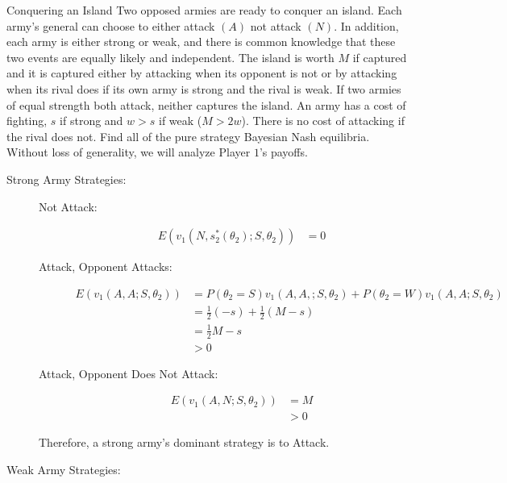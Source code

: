 \documentclass[9pt]{extarticle}
\title{}
\author{}
\date{}
\begin{document}
  \begin{problem}{Conquering an Island}
    Two opposed armies are ready to conquer an island. Each army's general can choose to either attack $(A)$ not attack $(N)$. In addition, each army is either strong or weak, and there is common knowledge that these two events are equally likely and independent. The island is worth $M$ if captured and it is captured either by attacking when its opponent is not or by attacking when its rival does if its own army is strong and the rival is weak. If two armies of equal strength both attack, neither captures the island. An army has a cost of fighting, $s$ if strong and $w > s$ if weak ($M > 2w$). There is no cost of attacking if the rival does not. Find all of the pure strategy Bayesian Nash equilibria.
    \tcblower
    Without loss of generality, we will analyze Player $1$'s payoffs.
    \begin{description}
      \item[Strong Army Strategies:]\hfill
        \begin{description}
          \item[Not Attack:]
            \begin{align*}
              E\left(v_1(N,s_2^{\ast}(\theta_2);S,\theta_2)\right) &= 0
            \end{align*}
          \item[Attack, Opponent Attacks:]
            \begin{align*}
              E\left(v_1(A,A;S,\theta_2)\right) &= P(\theta_2 = S)v_1(A,A,;S,\theta_2) + P(\theta_2 = W)v_1(A,A;S,\theta_2)\\
                                                &= \frac{1}{2}(-s) + \frac{1}{2}(M-s)\\
                                                &= \frac{1}{2}M - s\\
                                                &> 0
            \end{align*}
          \item[Attack, Opponent Does Not Attack:]
            \begin{align*}
              E\left(v_1(A,N;S,\theta_2)\right) &= M\\
                                                &> 0
            \end{align*}
        \end{description}
        Therefore, a strong army's dominant strategy is to Attack.
      \item[Weak Army Strategies:]

\end{description}
\end{problem}
\end{document}

